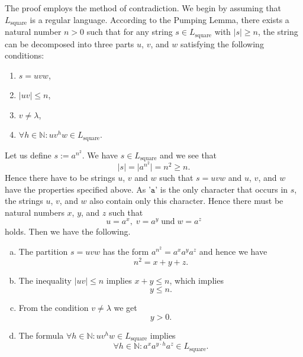 \solutionEng
The proof employs the method of contradiction. We begin by assuming that $L_{\mathrm{square}}$ is a regular
language. According to the Pumping Lemma, there exists a natural number $n > 0$ such that for any string
$s \in L_{\mathrm{square}}$ with $|s| \geq n$, the string can be decomposed into three parts $u$, $v$, and $w$ 
satisfying the following conditions:  
\begin{enumerate}
\item $s = uvw$,
\item $|uv| \leq n$,
\item $v \not= \lambda$,
\item $\forall h \in \mathbb{N}: uv^hw \in L_{\mathrm{square}}$. 
\end{enumerate} 
Let us define $s := a^{n^2}$.  We have $s \in L_{\mathrm{square}}$ and we see that
\[ |s| = \big| a^{n^2} \big| = n^2 \geq n. \]
Hence there have to be strings $u$, $v$ and $w$ such that $s = uvw$ and $u$, $v$, and $w$ have
the properties specified above.
As '$\mathtt{a}$' is the only character that occurs in $s$, the strings $u$, $v$, and $w$ also contain only this character.
Hence there must be natural numbers $x$, $y$, and $z$ such that 
\[ u = a^x,\; v = a^y\; \mbox{und}\; w = a^z \]
holds.  Then we have the following.
\begin{enumerate}[(a)]
\item The partition  $s = uvw$ has the form $a^{n^2} = a^xa^ya^z$ and hence we have
      \begin{equation}
        \label{eq:e1}
         n^2 = x + y + z.     
      \end{equation}
\item The inequality $|uv| \leq n$ implies $x +y \leq n$, which implies
      \begin{equation}
        \label{eq:e2}
        y \leq n.
      \end{equation}
\item From the condition $v \not= \lambda$ we get
      \begin{equation}
        \label{eq:e3}
        y > 0.
      \end{equation}
\item The formula $\forall h \in \mathbb{N}: uv^hw \in L_{\mathrm{square}}$ implies
      \begin{equation}
        \label{eq:e4}
        \forall h \in \mathbb{N}: a^xa^{y\cdot h}a^z \in L_{\mathrm{square}}. 
      \end{equation}
\end{enumerate}
